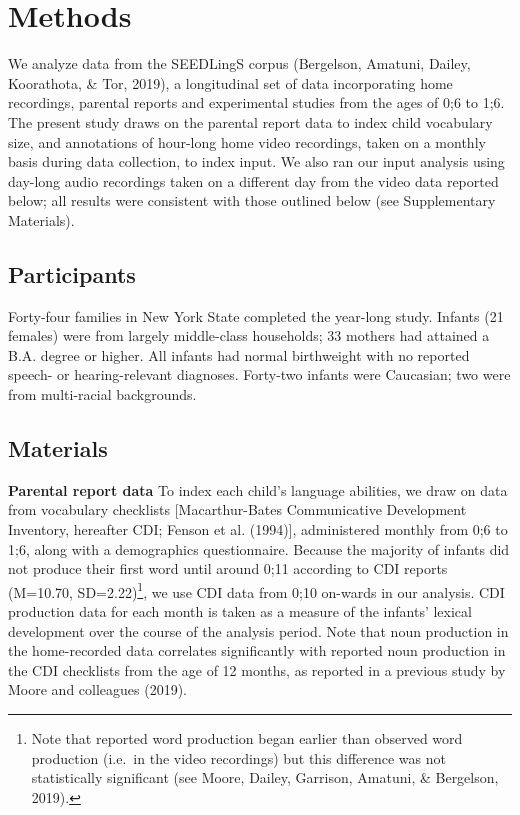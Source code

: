 \documentclass[
  man,floatsintext]{apa6}
\begin{document}
\hypertarget{methods}{%
\section{Methods}\label{methods}}

We analyze data from the SEEDLingS corpus (Bergelson, Amatuni, Dailey, Koorathota, \& Tor, 2019), a longitudinal set of data incorporating home recordings, parental reports and experimental studies from the ages of 0;6 to 1;6. The present study draws on the parental report data to index child vocabulary size, and annotations of hour-long home video recordings, taken on a monthly basis during data collection, to index input. We also ran our input analysis using day-long audio recordings taken on a different day from the video data reported below; all results were consistent with those outlined below (see Supplementary Materials).

\hypertarget{participants}{%
\subsection{Participants}\label{participants}}

Forty-four families in New York State completed the year-long study. Infants (21 females) were from largely middle-class households; 33 mothers had attained a B.A. degree or higher. All infants had normal birthweight with no reported speech- or hearing-relevant diagnoses. Forty-two infants were Caucasian; two were from multi-racial backgrounds.

\hypertarget{materials}{%
\subsection{Materials}\label{materials}}

\textbf{Parental report data} To index each child's language abilities, we draw on data from vocabulary checklists {[}Macarthur-Bates Communicative Development Inventory, hereafter CDI; Fenson et al. (1994){]}, administered monthly from 0;6 to 1;6, along with a demographics questionnaire. Because the majority of infants did not produce their first word until around 0;11 according to CDI reports (M=10.70, SD=2.22)\footnote{Note that reported word production began earlier than observed word production (i.e.~in the video recordings) but this difference was not statistically significant (see Moore, Dailey, Garrison, Amatuni, \& Bergelson, 2019).}, we use CDI data from 0;10 on-wards in our analysis. CDI production data for each month is taken as a measure of the infants' lexical development over the course of the analysis period. Note that noun production in the home-recorded data correlates significantly with reported noun production in the CDI checklists from the age of 12 months, as reported in a previous study by Moore and colleagues (2019).
\end{document}

